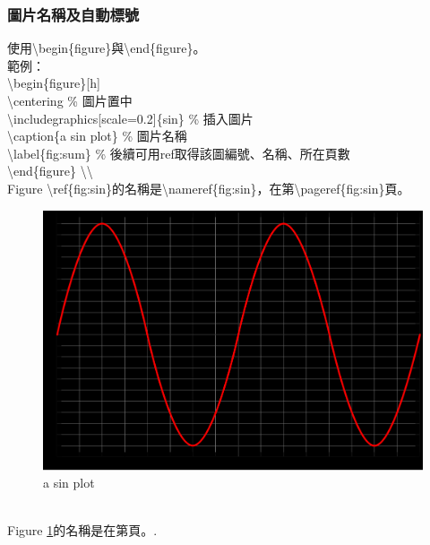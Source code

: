 \documentclass[12pt]{article}
\begin{document}
\begin{CJK*}{UTF8}{bsmi}
				\subsubsection{圖片名稱及自動標號}
					使用\textbackslash begin\{figure\}與\textbackslash end\{figure\}。 \\
					範例： \\
					\hspace*{2pc}\textbackslash begin\{figure\}[h] \\
					\hspace*{4pc}\textbackslash centering \% 圖片置中\\
					\hspace*{4pc}\textbackslash includegraphics[scale=0.2]\{sin\} \% 插入圖片 \\
					\hspace*{4pc}\textbackslash caption\{a sin plot\} \% 圖片名稱 \\
					\hspace*{4pc}\textbackslash label\{fig:sum\} \% 後續可用ref取得該圖編號、名稱、所在頁數 \\
					\hspace*{2pc}\textbackslash end\{figure\} \textbackslash \textbackslash \\
					\hspace*{2pc}Figure \textbackslash ref\{fig:sin\}的名稱是\textbackslash nameref\{fig:sin\}，在第\textbackslash pageref\{fig:sin\}頁。 \\
					\begin{figure}[h]
						\centering
						\includegraphics[scale=0.2]{sin}
						\caption{a sin plot}
						\label{fig:sin}
					\end{figure} \\
					Figure \ref{fig:sin}的名稱是在第\pageref{fig:sin}頁。.
			\newpage

\end{CJK*}
\end{document}
